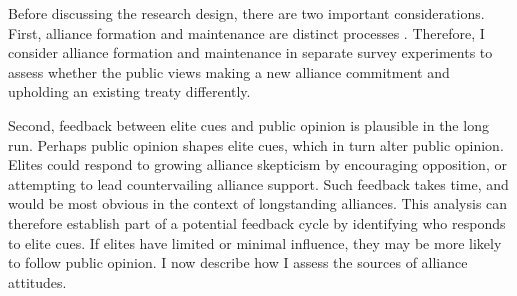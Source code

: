 \documentclass[12pt]{article}
\begin{document}




Before discussing the research design, there are two important considerations. 
First, alliance formation and maintenance are distinct processes \citep{Snyder1997}. 
Therefore, I consider alliance formation and maintenance in separate survey experiments to assess whether the public views making a new alliance commitment and upholding an existing treaty differently. 


Second, feedback between elite cues and public opinion is plausible in the long run. 
Perhaps public opinion shapes elite cues, which in turn alter public opinion. 
Elites could respond to growing alliance skepticism by encouraging opposition, or attempting to lead countervailing alliance support.
Such feedback takes time, and would be most obvious in the context of longstanding alliances.
This analysis can therefore establish part of a potential feedback cycle by identifying who responds to elite cues.  
If elites have limited or minimal influence, they may be more likely to follow public opinion.
I now describe how I assess the sources of alliance attitudes. 
\end{document}
